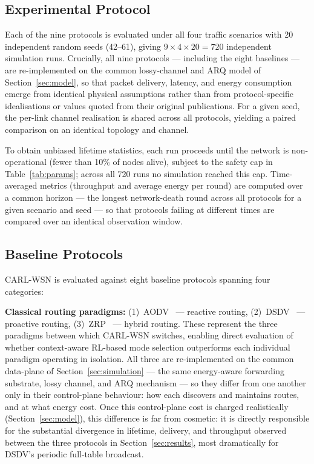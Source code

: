 \documentclass[12pt]{article}
\begin{document}
\subsection{Experimental Protocol}

Each of the nine protocols is evaluated under all four traffic
scenarios with 20 independent random seeds (42--61), giving
$9 \times 4 \times 20 = 720$ independent simulation runs. Crucially,
all nine protocols --- including the eight baselines --- are
re-implemented on the common lossy-channel and ARQ model of
Section~\ref{sec:model}, so that packet delivery, latency, and energy
consumption emerge from identical physical assumptions rather than
from protocol-specific idealisations or values quoted from their
original publications. For a given seed, the per-link channel
realisation is shared across all protocols, yielding a paired
comparison on an identical topology and channel.

To obtain unbiased lifetime statistics, each run proceeds until the
network is non-operational (fewer than 10\% of nodes alive), subject
to the safety cap in Table~\ref{tab:params}; across all 720 runs no
simulation reached this cap. Time-averaged metrics (throughput and
average energy per round) are computed over a common horizon --- the
longest network-death round across all protocols for a given scenario
and seed --- so that protocols failing at different times are compared
over an identical observation window.

\subsection{Baseline Protocols}

CARL-WSN is evaluated against eight baseline protocols spanning
four categories:

\textbf{Classical routing paradigms:}
(1)~AODV~\cite{perkins1999} --- reactive routing,
(2)~DSDV~\cite{perkins1994} --- proactive routing,
(3)~ZRP~\cite{haas2001} --- hybrid routing.
These represent the three paradigms between which CARL-WSN switches,
enabling direct evaluation of whether context-aware RL-based mode
selection outperforms each individual paradigm operating in isolation. All three are re-implemented on the common data-plane of
Section~\ref{sec:simulation} --- the same energy-aware forwarding substrate, lossy channel, and
ARQ mechanism --- so they differ from one another only in their
control-plane behaviour: how each discovers and maintains routes, and
at what energy cost. Once this control-plane cost is charged
realistically (Section~\ref{sec:model}), this difference is far from cosmetic: it
is directly responsible for the substantial divergence in lifetime,
delivery, and throughput observed between the three protocols in
Section~\ref{sec:results}, most dramatically for DSDV's periodic full-table
broadcast.
\end{document}
